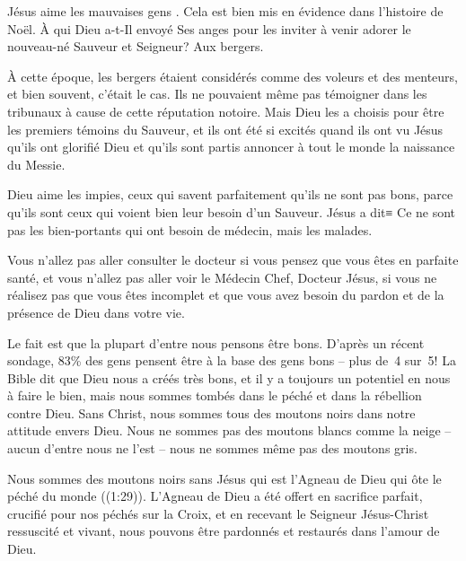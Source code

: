 

Jésus aime les \og mauvaises gens \fg{}. Cela est bien mis en évidence dans l'histoire de Noël. À qui Dieu a-t-Il envoyé Ses anges pour les inviter à venir adorer le nouveau-né Sauveur et Seigneur? Aux bergers.

À cette époque, les bergers étaient considérés comme des voleurs et des menteurs, et bien souvent, c'était le cas. Ils ne pouvaient même pas témoigner dans les tribunaux à cause de cette réputation notoire. Mais Dieu les a choisis pour être les premiers témoins du Sauveur, et ils ont été si excités quand ils ont vu Jésus qu'ils ont glorifié Dieu et qu'ils sont partis annoncer à tout le monde la naissance du Messie.

Dieu aime les impies, ceux qui savent parfaitement qu'ils ne sont pas bons, parce qu'ils sont ceux qui voient bien leur besoin d'un Sauveur. Jésus a dit≡ \og Ce ne sont pas les bien-portants qui ont besoin de médecin, mais les malades. \fg{}

Vous n'allez pas aller consulter le docteur si vous pensez que vous êtes en parfaite santé, et vous n'allez pas aller voir le Médecin Chef, Docteur Jésus, si vous ne réalisez pas que vous êtes incomplet et que vous avez besoin du pardon et de la présence de Dieu dans votre vie.

Le fait est que la plupart d'entre nous pensons être bons. D'après un récent sondage, 83\% des gens pensent être à la base des gens bons – plus de~4 sur~5! La Bible dit que Dieu nous a créés très bons, et il y a toujours un potentiel en nous à faire le bien, mais nous sommes tombés dans le péché et dans la rébellion contre Dieu. Sans Christ, nous sommes tous des moutons noirs dans notre attitude envers Dieu. Nous ne sommes pas des moutons blancs comme la neige – aucun d'entre nous ne l'est – nous ne sommes même pas des moutons gris.

Nous sommes des moutons noirs sans Jésus qui est \og l'Agneau de Dieu qui ôte le péché du monde \fg{} ((1:29)). L'Agneau de Dieu a été offert en sacrifice parfait, crucifié pour nos péchés sur la Croix, et en recevant le Seigneur Jésus-Christ ressuscité et vivant, nous pouvons être pardonnés et restaurés dans l'amour de Dieu.

